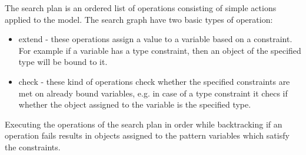 The search plan is an ordered list of operations consisting of simple actions
applied to the model. The search graph have two basic types of operation:

\begin{itemize}
  \item extend - these operations assign a value to a variable based on a
  constraint. For example if a variable has a type constraint, then an object of
  the specified type will be bound to it.
  \item check - these kind of operations check whether the specified
  constraints are met on already bound variables, e.g. in case of a type
  constraint it checs if whether the object assigned to the variable is the
  specified type.
\end{itemize}

Executing the operations of the search plan in order while backtracking if an
operation fails results in objects assigned to the pattern variables which
satisfy the constraints.
